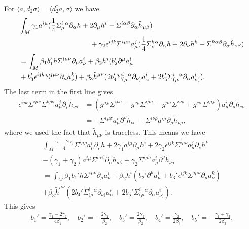 \documentclass[10pt]{report}
\theoremstyle{definition}
\begin{document}
For $\langle a, d_2 \sigma \rangle = \langle d_2^* a, \sigma \rangle$ we have
\begin{align}\nonumber
& \int_M \gamma_1 a^{i\mu} (  \frac{1}{4} \Sigma^i_\mu{}^\alpha \partial_\alpha h +2 \partial_\mu h^i -  \Sigma^{i\alpha\beta} \partial_\alpha \tilde{h}_{\mu\beta} )
 \\ \nonumber & \hspace{100pt} + \gamma_2 \epsilon^{ijk} \Sigma^{i\mu\nu} a^j_\mu ( \frac{1}{4} \Sigma^k_\nu{}^\alpha \partial_\alpha h +2 \partial_\nu h^k -  \Sigma^{k\alpha\beta} \partial_\alpha \tilde{h}_{\nu\beta}  ) \\ \nonumber & = 
\int_M \beta_1 b_1' h \Sigma^{i\mu\nu} \partial_\mu a_\nu^i + \beta_2 h^i (b_2' \partial^\mu a_\mu^i \\ \nonumber & \vspace{100pt} + b_3' \epsilon^{ijk} \Sigma^{j\mu\nu} \partial_\mu a_\nu^k) + \beta_3 \tilde{h}^{\mu\nu} (2b_4' \Sigma^i_{(\mu}{}^\alpha \partial_{\nu)}a_\alpha^i +  2b_5' \Sigma^i_{(\mu}{}^\alpha \partial_\alpha a_{\nu)}^i).
\end{align}
The last term in the first line gives
\begin{align}
\epsilon^{ijk} \Sigma^{i\mu\nu}   \Sigma^{k\rho\sigma} a^j_\mu \partial_\rho \tilde{h}_{\nu\sigma} & = ( g^{\mu\rho} \Sigma^{i\nu\sigma} - g^{\nu\rho} \Sigma^{i\mu\sigma} - g^{\mu\sigma} \Sigma^{i\nu\rho} + g^{\nu\sigma} \Sigma^{i\mu\rho})a^i_\mu \partial_\rho \tilde{h}_{\nu\sigma} \\ \nonumber & = 
- \Sigma^{i\mu\sigma}a^i_\mu \partial^\nu \tilde{h}_{\nu\sigma} - \Sigma^{i\nu\rho} a^{i\mu} \partial_\rho \tilde{h}_{\nu\mu},
\end{align}
where we used the fact that $\tilde{h}_{\mu\nu}$ is traceless. This means we have
\begin{align}\nonumber
\int_M \frac{\gamma_1- 2\gamma_2}{4} \Sigma^{i\mu\rho}a^i_\mu \partial_\rho h +2\gamma_1 a^{i\mu} \partial_\mu h^i + 2\gamma_2 \epsilon^{ijk} \Sigma^{i\mu\nu} a^j_\mu  \partial_\nu h^k 
\\ \nonumber - (\gamma_1 +\gamma_2)a^{i\mu} \Sigma^{i\alpha\beta} \partial_\alpha \tilde{h}_{\mu\beta} +\gamma_2 \Sigma^{i\mu\sigma}a^i_\mu \partial^\nu \tilde{h}_{\nu\sigma} 
 \\ \nonumber =
\int_M \beta_1 b_1' h \Sigma^{i\mu\nu} \partial_\mu a_\nu^i + \beta_2 h^i (b_2' \partial^\mu a_\mu^i + b_3' \epsilon^{ijk} \Sigma^{j\mu\nu} \partial_\mu a_\nu^k) \\ \nonumber  + \beta_3 \tilde{h}^{\mu\nu} (2b_4' \Sigma^i_{(\mu}{}^\alpha \partial_{\nu)}a_\alpha^i +  2b_5' \Sigma^i_{(\mu}{}^\alpha \partial_\alpha a_{\nu)}^i).
\end{align}
This gives
\begin{align}
b_1' =  \frac{\gamma_1-2\gamma_2}{4\beta_1}, \quad b_2' = - \frac{2\gamma_1}{\beta_2}, \quad b_3'= \frac{2\gamma_2}{\beta_2}, \quad b_4'= \frac{\gamma_2}{2\beta_3}, \quad b_5'= - \frac{\gamma_1+\gamma_2}{2\beta_3}.
\end{align}
\end{document}
